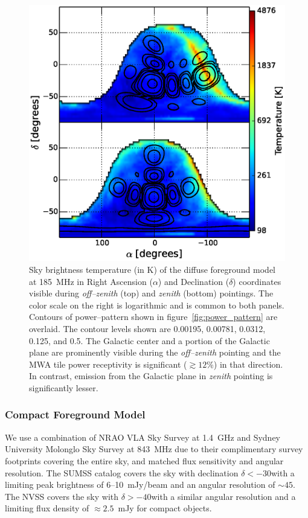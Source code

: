 \documentclass[preprint2,iop,numberedappendix]{emulateapj}
\begin{document}
\begin{figure}[htb]
\centering
\includegraphics[width=\linewidth]{figures/v1_0/dsm.eps}
\caption{Sky brightness temperature (in K) of the diffuse foreground model at 185~MHz in Right Ascension ($\alpha$) and Declination ($\delta$) coordinates visible during {\it off--zenith} (top) and {\it zenith} (bottom) pointings. The color scale on the right is logarithmic and is common to both panels. Contours of power--pattern shown in figure~\ref{fig:power_pattern} are overlaid. The contour levels shown are 0.00195, 0.00781, 0.0312, 0.125, and 0.5. The Galactic center and a portion of the Galactic plane are prominently visible during the {\it off--zenith} pointing and the MWA tile power receptivity is significant ($\gtrsim 12$\%) in that direction. In contrast, emission from the Galactic plane in {\it zenith} pointing is significantly lesser. \label{fig:DSM}}
\end{figure}

\subsubsection{Compact Foreground Model}\label{sec:CSM}

We use a combination of NRAO VLA Sky Survey \citep[NVSS;][]{con98} at 1.4~GHz and Sydney University Molonglo Sky Survey \citep[SUMSS;][]{boc99,mau03} at 843~MHz due to their complimentary survey footprints covering the entire sky, and matched flux sensitivity and angular resolution. The SUMSS catalog covers the sky with declination $\delta < -30$\arcdeg with a limiting peak brightness of 6--10~mJy/beam and an angular resolution of $\sim 45$\arcsec. The NVSS covers the sky with $\delta > -40$\arcdeg with a similar angular resolution and a limiting flux density of $\approx 2.5$~mJy for compact objects. 
\end{document}
